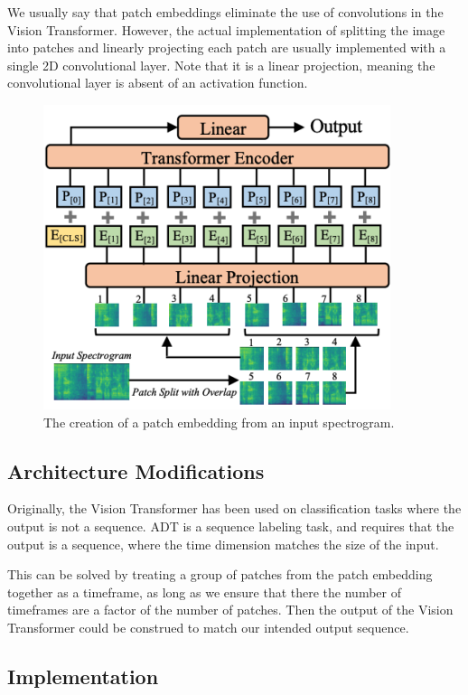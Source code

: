 We usually say that patch embeddings eliminate the use of convolutions in the Vision Transformer. However, the actual implementation of splitting the image into patches and linearly projecting each patch are usually implemented with a single 2D convolutional layer. Note that it is a linear projection, meaning the convolutional layer is absent of an activation function.

\begin{figure}[H]
    \centering
    \includegraphics[trim=0 0 0 132, clip, scale=0.7]{figures/patchembedding.png}
    \caption{The creation of a patch embedding from an input spectrogram.}
    \label{PatchEmbeddingFigure}
\end{figure}

\subsection{Architecture Modifications}

Originally, the Vision Transformer has been used on classification tasks where the output is not a sequence. \gls{ADT} is a sequence labeling task, and requires that the output is a sequence, where the time dimension matches the size of the input.

This can be solved by treating a group of patches from the patch embedding together as a timeframe, as long as we ensure that there the number of timeframes are a factor of the number of patches. Then the output of the Vision Transformer could be construed to match our intended output sequence.

\subsection{Implementation}

